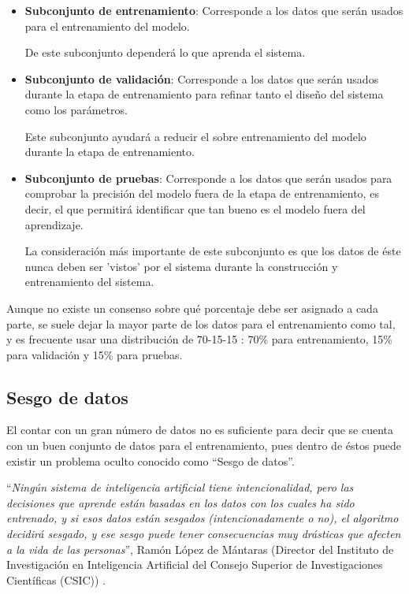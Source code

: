         
        \begin{itemize}
            \item \textbf{Subconjunto de entrenamiento}: Corresponde a los datos que serán usados para el entrenamiento del modelo.
            
            De este subconjunto dependerá lo que aprenda el sistema.
            
            \item \textbf{Subconjunto de validación}: Corresponde a los datos que serán usados durante la etapa de entrenamiento para refinar tanto el diseño del sistema como los parámetros.
            
            Este subconjunto ayudará a reducir el sobre entrenamiento del modelo durante la etapa de entrenamiento.
            
            \item \textbf{Subconjunto de pruebas}: Corresponde a los datos que serán usados para comprobar la precisión del modelo fuera de la etapa de entrenamiento, es decir, el que permitirá identificar que tan bueno es el modelo fuera del aprendizaje.
            
            La consideración más importante de este subconjunto es que los datos de éste nunca deben ser 'vistos' por el sistema durante la construcción y entrenamiento del sistema.
        \end{itemize}
        
        Aunque no existe un consenso sobre qué porcentaje debe ser asignado a cada parte, se suele dejar la mayor parte de los datos para el entrenamiento como tal, y es frecuente usar una distribución de 70-15-15 \cite{Valipour2016, Hemmat2015, Turabieh2019, Rojas2019heart}: 70\% para entrenamiento, 15\% para validación y 15\% para pruebas.
        
    \subsection{Sesgo de datos}
    \label{sub:FrameDatasetBias}
        El contar con un gran número de datos no es suficiente para decir que se cuenta con un buen conjunto de datos para el entrenamiento, pues dentro de éstos puede existir un problema oculto conocido como ``Sesgo de datos''.
        
        ``\textit{Ningún sistema de inteligencia artificial tiene intencionalidad, pero las decisiones que aprende están basadas en los datos con los cuales ha sido entrenado, y si esos datos están sesgados (intencionadamente o no), el algoritmo decidirá sesgado, y ese sesgo puede tener consecuencias muy drásticas que afecten a la vida de las personas}'', Ramón López de Mántaras (Director del Instituto de Investigación en Inteligencia Artificial del Consejo Superior de Investigaciones Científicas (CSIC)) \cite{Vanguardia2017Sesgo}.
        
